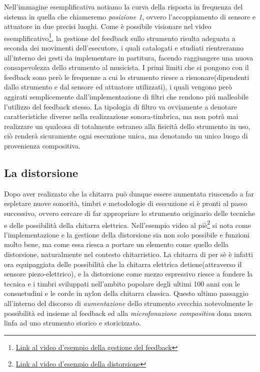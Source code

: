 \documentclass[oneside]{article}
\begin{document}
\begin{multicols*}{2}
Nell'immagine esemplificativa notiamo la curva della risposta in frequenza del sistema in quella che chiameremo \textit{posizione 1}, ovvero l'accoppiamento di sensore e attuatore in due precisi luoghi. Come è possibile visionare nel video esemplificativo\footnote{\href{https://www.youtube.com/watch?v=7BwwTopM3Ek}{Link al video d'esempio della gestione del feedback}}, la gestione del feedback sullo strumento risulta adeguata a seconda dei movimenti dell'esecutore, i quali catalogati e studiati rientreranno all'interno dei gesti da implementare in partitura, facendo raggiungere una nuova consapevolezza dello strumento al musicista. I primi limiti che si pongono con il feedback sono però le frequenze a cui lo strumento riesce a risuonare(dipendenti dallo strumento e dal sensore ed attuatore utilizzati), i quali vengono però aggirati semplicemente dall'implementazione di filtri che rendono piú malleabile l'utilizzo del feedback stesso. La tipologia di filtro va ovviamente a denotare caratteristiche diverse nella realizzazione sonora-timbrica, ma non potrà mai realizzare un qualcosa di totalmente estraneo alla fisicità dello strumento in uso, ciò renderà sicuramente ogni esecuzione unica, ma denotando un unico luogo di provenienza compositiva.

\subsection{La distorsione} 
Dopo aver realizzato che la chitarra può dunque essere aumentata riuscendo a far espletare nuove sonorità, timbri e metodologie di esecuzione si è pronti al passo successivo, ovvero cercare di far appropriare lo strumento originario delle tecniche e delle possibilità della chitarra elettrica. Nell'esempio video al piè\footnote{\href{https://www.youtube.com/watch?v=K3yqyxcJStg}{Link al video d'esempio della distorsione}} si nota come l'implementazione e la gestione della distorsione sia non solo possibile e funzioni molto bene, ma come essa riesca a portare un elemento come quello della distorsione, naturalmente nel contesto chitarristico. La chitarra di per sè è infatti ora equipaggiata delle possibilità che la chitarra elettrica detiene(attraverso il sensore piezo-elettrico), e la distorsione come mezzo espressivo riesce a fondere la tecnica e i timbri sviluppati nell'ambito popolare degli ultimi 100 anni con le consuetudini e le corde in nylon della chitarra classica. Questo ultimo passaggio all'interno del discorso di \textit{aumentazione} dello strumento svecchia notevolmente le possibilità ed insieme al feedback ed alla \textit{microfonazione compositiva} dona nuova linfa ad uno strumento storico e storicizzato.



\end{multicols*}
\end{document}
